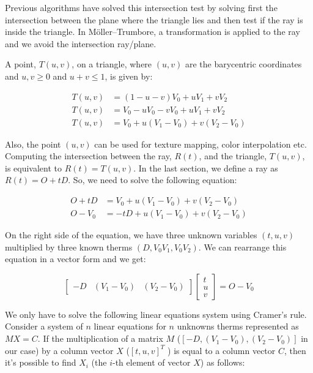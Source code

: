 \documentclass[titlepage,12pt]{report}
\begin{document}
Previous algorithms have solved this intersection test by solving first the intersection between the plane where the triangle lies and then test if the ray is inside the triangle. In Möller–Trumbore, a transformation is applied to the ray and we avoid the intersection ray/plane.

A point, $T(u,v)$, on a triangle, where $(u,v)$ are the barycentric coordinates and $u,v \geq 0$ and $u+v \leq 1$, is given by:

\begin{equation} \label{barycentric}
\begin{split}
T(u,v) & = (1-u-v)V_0 + uV_1 + vV_2 \\
T(u,v) & = V_0 - uV_0 - vV_0 + uV_1 + vV_2 \\
T(u,v) & = V_0 + u(V_1 - V_0) + v(V_2 - V_0)
\end{split}
\end{equation}

Also, the point $(u,v)$ can be used for texture mapping, color interpolation etc. Computing the intersection between the ray, $R(t)$, and the triangle, $T(u,v)$, is equivalent to $R(t) = T(u,v)$. In the last section, we define a ray as $R(t) = O + t D$. So, we need to solve the following equation:

\begin{equation}
\begin{split}
O + tD & = V_0 + u(V_1 - V_0) + v(V_2 - V_0) \\
O - V_0 & = -tD + u(V_1 - V_0) + v(V_2 - V_0)
\end{split}
\end{equation}

On the right side of the equation, we have three unknown variables $(t,u,v)$ multiplied by three known therms $(D, V_0V_1, V_0V_2)$. We can rearrange this equation in a vector form and we get:

\begin{equation}
\begin{bmatrix}
-D & \left(V_1 - V_0\right) & \left(V_2 - V_0\right)
\end{bmatrix}
\begin{bmatrix}
t \\ u \\ v
\end{bmatrix}
= O - V_0
\end{equation}

We only have to solve the following linear equations system using Cramer's rule. Consider a system of $n$ linear equations for $n$ unknowns therms represented as $MX = C$. If the multiplication of a matrix $M$ ($\left[-D, \left(V_1 - V_0\right), \left(V_2 - V_0\right)\right]$ in our case) by a column vector $X$ ($\left[t,u,v\right]^T$ ) is equal to a column vector $C$, then it's possible to find $X_i$ (the $i$-th element of vector $X$) as follows: 
\end{document}
